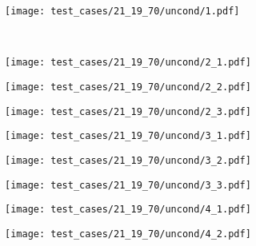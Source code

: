 
\begin{figure}[H]
\centering
\begin{subfigure}{0.32\textwidth}
  \centering
  \texttt{[image: test\_cases/21\_19\_70/uncond/1.pdf]}
\end{subfigure}\\
\begin{subfigure}{0.32\textwidth}
  \centering
  \texttt{[image: test\_cases/21\_19\_70/uncond/2\_1.pdf]}
\end{subfigure} 
\begin{subfigure}{0.32\textwidth}
  \centering
  \texttt{[image: test\_cases/21\_19\_70/uncond/2\_2.pdf]}
\end{subfigure}
\begin{subfigure}{0.32\textwidth}
  \centering
  \texttt{[image: test\_cases/21\_19\_70/uncond/2\_3.pdf]}
\end{subfigure}
\begin{subfigure}{0.32\textwidth}
  \centering
  \texttt{[image: test\_cases/21\_19\_70/uncond/3\_1.pdf]}
\end{subfigure}
\begin{subfigure}{0.32\textwidth}
  \centering
  \texttt{[image: test\_cases/21\_19\_70/uncond/3\_2.pdf]}
\end{subfigure}
\begin{subfigure}{0.32\textwidth}
  \centering
  \texttt{[image: test\_cases/21\_19\_70/uncond/3\_3.pdf]}
\end{subfigure}
\begin{subfigure}{0.32\textwidth}
  \centering
  \texttt{[image: test\_cases/21\_19\_70/uncond/4\_1.pdf]}
\end{subfigure} 
\begin{subfigure}{0.32\textwidth}
  \centering
  \texttt{[image: test\_cases/21\_19\_70/uncond/4\_2.pdf]}

\end{subfigure}
\end{figure}
